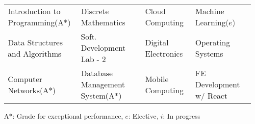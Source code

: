 
\begin{tabular*}{\textwidth}{l l l l}
  Introduction to Programming(A$*$) & Discrete Mathematics  & Cloud Computing & Machine Learning($e$)
                                                                              \\
  Data Structures and Algorithms & Soft. Development Lab - 2 & Digital Electronics & Operating Systems \\
  Computer Networks(A$*$) &  Database Management System(A$*$) & Mobile Computing & FE Development w/ React
\end{tabular*}


{\footnotesize
    {A$*$: Grade for exceptional performance, $e$: Elective, $i$: In progress}
}

\vspace{-0.5cm}


